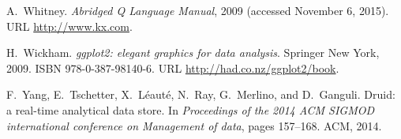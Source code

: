 \documentclass{acm_proc_article-sp}
\begin{document}
\begin{thebibliography}{28}
A.~Whitney.
\newblock \emph{Abridged Q Language Manual}, 2009 (accessed November 6, 2015).
\newblock URL \url{http://www.kx.com}.

H.~Wickham.
\newblock \emph{ggplot2: elegant graphics for data analysis}.
\newblock Springer New York, 2009.
\newblock ISBN 978-0-387-98140-6.
\newblock URL \url{http://had.co.nz/ggplot2/book}.

F.~Yang, E.~Tschetter, X.~L{\'e}aut{\'e}, N.~Ray, G.~Merlino, and D.~Ganguli.
\newblock Druid: a real-time analytical data store.
\newblock In \emph{Proceedings of the 2014 ACM SIGMOD international conference
  on Management of data}, pages 157--168. ACM, 2014.

\end{thebibliography}


\end{document}
